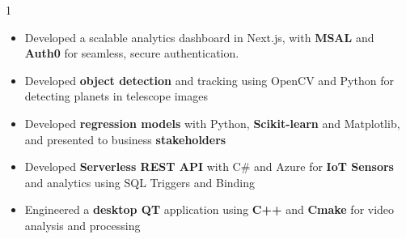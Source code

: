 \documentclass[11pt,a4paper,ragged2e]{altacv}
\begin{document}
\begin{paracol}{1}
\begin{itemize}
\item Developed a scalable analytics dashboard in Next.js, with \textbf{MSAL} and \textbf{Auth0} for seamless, secure authentication.
\item Developed \textbf{object detection} and tracking using OpenCV and Python for detecting planets in telescope images
\item Developed \textbf{regression models} with Python, \textbf{Scikit-learn} and Matplotlib, and presented to business \textbf{stakeholders}
\item Developed \textbf{Serverless REST API} with C\# and Azure for \textbf{IoT Sensors} and analytics using SQL Triggers and Binding
\item Engineered a \textbf{desktop QT} application using \textbf{C++} and \textbf{Cmake} for video analysis and processing
\end{itemize}
\tightdivider


\end{paracol}
\end{document}
